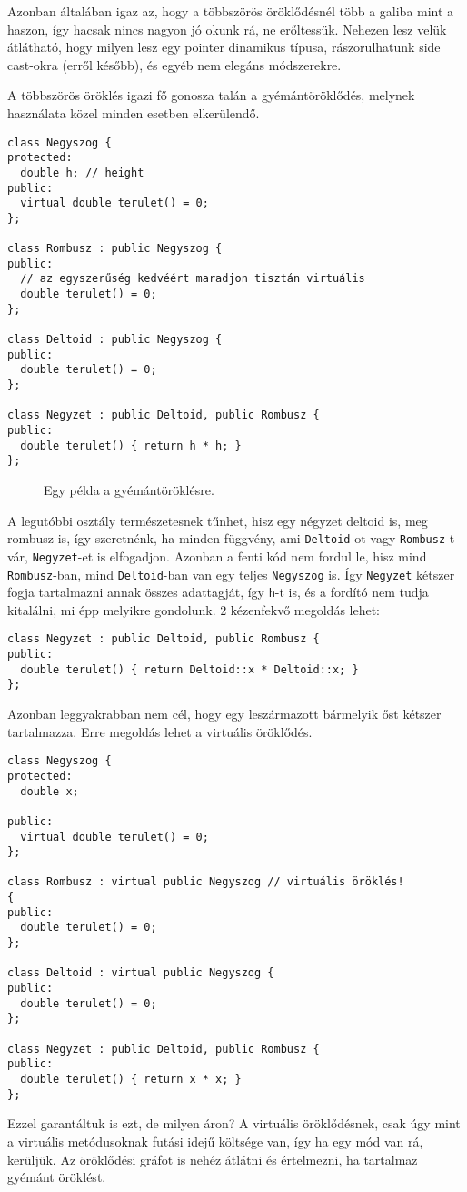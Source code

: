\documentclass[../cpp_book/cpp_book.tex]{subfiles}
\begin{document}
	Azonban általában igaz az, hogy a többszörös öröklődésnél több a galiba mint a haszon, így hacsak nincs nagyon jó okunk rá, ne erőltessük. Nehezen lesz velük átlátható, hogy milyen lesz egy pointer dinamikus típusa, rászorulhatunk side cast-okra (erről később), és egyéb nem elegáns módszerekre.
	
	\medskip
	A többszörös öröklés igazi fő gonosza talán a gyémántöröklődés, melynek használata közel minden esetben elkerülendő.
	\begin{lstlisting}
class Negyszog {
protected:
  double h; // height
public:
  virtual double terulet() = 0;
};

class Rombusz : public Negyszog {
public:
  // az egyszerűség kedvéért maradjon tisztán virtuális
  double terulet() = 0;
};

class Deltoid : public Negyszog {
public:
  double terulet() = 0;
};

class Negyzet : public Deltoid, public Rombusz {
public:
  double terulet() { return h * h; }
};
	\end{lstlisting}
	\begin{figure}
		\centering
		
		
		\caption{Egy példa a gyémántöröklésre.}\label{fig_uml_diamond_inheritance}
	\end{figure}
	A legutóbbi osztály természetesnek tűnhet, hisz egy négyzet deltoid is, meg rombusz is, így szeretnénk, ha minden függvény, ami \texttt{Deltoid}-ot vagy \texttt{Rombusz}-t vár, \texttt{Negyzet}-et is elfogadjon. Azonban a fenti kód nem fordul le, hisz mind \texttt{Rombusz}-ban, mind \texttt{Deltoid}-ban van egy teljes \texttt{Negyszog} is. Így \texttt{Negyzet} kétszer fogja tartalmazni annak összes adattagját, így \texttt{h}-t is, és a fordító nem tudja kitalálni, mi épp melyikre gondolunk. 2 kézenfekvő megoldás lehet:
	\begin{lstlisting}
class Negyzet : public Deltoid, public Rombusz {
public:
  double terulet() { return Deltoid::x * Deltoid::x; }
};
	\end{lstlisting}
	Azonban leggyakrabban nem cél, hogy egy leszármazott bármelyik őst kétszer tartalmazza. Erre megoldás lehet a virtuális öröklődés.
\begin{lstlisting}
class Negyszog {
protected:
  double x;

public:
  virtual double terulet() = 0;
};

class Rombusz : virtual public Negyszog // virtuális öröklés!
{
public:
  double terulet() = 0;
};

class Deltoid : virtual public Negyszog {
public:
  double terulet() = 0;
};

class Negyzet : public Deltoid, public Rombusz {
public:
  double terulet() { return x * x; }
};
\end{lstlisting}
	Ezzel garantáltuk is ezt, de milyen áron? A virtuális öröklődésnek, csak úgy mint a virtuális metódusoknak futási idejű költsége van, így ha egy mód van rá, kerüljük. Az öröklődési gráfot is nehéz átlátni és értelmezni, ha tartalmaz gyémánt öröklést.
	
\end{document}
